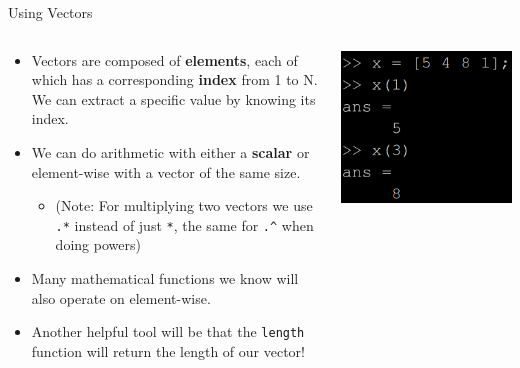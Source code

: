 {}\documentclass[letterpaper,
compress,
xcolor=x11names,
]{beamer}
\begin{document}
\begin{frame}{Using Vectors}
	\footnotesize
	\begin{columns}
		\begin{column}{0.75\linewidth}
			\begin{itemize}
				\item Vectors are composed of \textbf{elements}, each of which has a corresponding \textbf{index} from 1 to N. We can extract a specific value by knowing its index.
				\item<2-> We can do arithmetic with either a \textbf{scalar} or element-wise with a vector of the same size.
				\begin{itemize}
					\scriptsize
					\item (Note: For multiplying two vectors we use \texttt{.*} instead of just \texttt{*}, the same for \texttt{.\^{}} when doing powers)
				\end{itemize}
				\item<3-> Many mathematical functions we know will also operate on element-wise.
				\item<4-> Another helpful tool will be that the \texttt{length} function will return the length of our vector!
			\end{itemize}
		\end{column}
		\begin{column}{0.25\linewidth}
			\includegraphics[width = \linewidth]{vector_elements.png}

\end{column}
\end{columns}
\end{frame}
\end{document}
